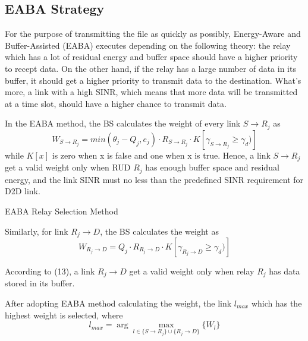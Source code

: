 \documentclass[conference]{IEEEtran}
\begin{document}
\subsection{EABA Strategy}
For the purpose of transmitting the file as quickly as possibly, Energy-Aware and Buffer-Assisted (EABA) executes depending on the following theory: the relay which has a lot of residual energy and buffer space should  have a higher priority to recept data. On the other hand, if the relay has a large number of data in its buffer, it should get a higher priority to transmit data to the destination. What's more, a link with a high SINR, which means that more data will be transmitted at a time slot, should have a higher chance to transmit data.

In the EABA method, the BS calculates the weight of every link $S \rightarrow R_j$ as
\begin{equation}
W_{S\rightarrow R_j} = min(\theta_j - Q_j,e_j) \cdot R_{S\rightarrow R_j} \cdot K[\gamma_{S\rightarrow R_j} \geq \gamma_d)]
\end{equation}
while $K[x]$ is zero when x is false and one when x is true. Hence, a link $S \rightarrow R_j$ get a valid weight only when RUD $R_j$ has enough buffer space and residual energy, and the link SINR must no less than the predefined SINR requirement for D2D link.

\begin{algorithm}[!t]
\caption{EABA Relay Selection Method}
\begin{algorithmic} [1]
\end{algorithmic}
\end{algorithm}

Similarly, for link $R_j \rightarrow D$, the BS calculates the weight as
\begin{equation}
W_{R_j \rightarrow D} = Q_j \cdot R_{R_j \rightarrow D} \cdot K[\gamma_{R_j \rightarrow D} \geq \gamma_d)]
\end{equation}

According to (13), a link $R_j \rightarrow D$ get a valid weight only when relay $R_j$ has data stored in its buffer.

After adopting EABA method calculating the weight, the link $l_{max}$ which has the highest weight is selected, where
\begin{equation}
l_{max} = \arg \max_{l \in \{S \rightarrow R_j\} \cup \{R_j \rightarrow D\}}\{W_l\}
\end{equation}
\end{document}
